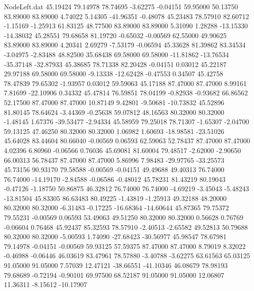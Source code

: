 \begin{filecontents}{NodeLeft.dat}
  45.19424   79.14978   78.74695    -3.62275   -0.04151   59.95000   50.13750   83.89000   83.89000    4.74022    5.14305  -41.96351   -0.48078
  45.23483   78.57910   82.60712    -1.15169   -1.25913   61.83125   48.77500   83.89000   83.89000    5.31090    1.28288  -13.15330  -14.38032
  45.28551   79.68658   81.19720    -0.65032   -0.00569   62.55000   49.90625   83.89000   83.89000    4.20341    2.69279   -7.53179   -0.06594
  45.33628   81.39862   83.34534    -3.04975   -2.83488   48.82500   35.68438   69.58000   69.58000  -11.81862  -13.76534  -35.37148  -32.87933
  45.38685   78.71338   82.20428    -0.04151    0.03012   45.22187   29.97188   69.58000   69.58000   -9.13338  -12.62428   -0.47553    0.34507
  45.42758   78.47839   79.65302    -1.93957    0.03012   59.59063   45.17188   87.47000   87.47000    8.99161    7.81699  -22.10906    0.34332
  45.47814   76.59851   78.04199    -0.82938   -0.93682   66.86562   52.17500   87.47000   87.47000   10.87149    9.42801   -9.50681  -10.73832
  45.52896   81.80145   78.64624    -3.44369   -0.25638   59.07812   48.16563   80.32000   80.32000   -1.48145    1.67376  -39.53477   -2.94334
  45.58959   79.25018   78.71307    -1.65307   -2.04700   59.13125   47.46250   80.32000   80.32000    1.06982    1.60693  -18.98581  -23.51026
  45.64028   83.44604   80.66040    -0.00569    0.06593   62.59063   52.78437   87.47000   87.47000    4.02396    6.80960   -0.06566    0.76036
  45.69081   81.60004   79.48517    -2.62000   -2.90650   66.00313   56.78437   87.47000   87.47000    5.86996    7.98483  -29.97765  -33.25573
  45.73156   90.93170   79.58588    -0.00569   -0.04151   49.49688   49.40313   76.74000   76.74000  -14.19170   -2.84588   -0.06586   -0.48012
  45.78231   81.43219   80.19043    -0.47126   -1.18750   50.86875   46.32812   76.74000   76.74000   -4.69219   -3.45043   -5.48243  -13.81504
  45.83305   86.63483   80.49225    -1.43819   -1.25913   49.32188   48.20000   80.32000   80.32000   -6.31483   -0.17225  -16.68364  -14.60644
  45.87365   79.75372   79.55231    -0.00569    0.06593   53.49063   49.51250   80.32000   80.32000    0.56628    0.76769   -0.06604    0.76468
  45.92437   85.32593   78.57910    -2.40513   -2.65582   49.52813   50.79688   80.32000   80.32000   -5.00593    1.74090  -27.68423  -30.56977
  45.98547   78.67981   79.14978    -0.04151   -0.00569   59.93125   57.59375   87.47000   87.47000    8.79019    8.32022   -0.46988   -0.06446
  46.03619   83.47961   78.57880    -3.40788   -3.62275   63.61563   65.03125   91.05000   91.05000    7.57039   12.47121  -38.66551  -41.10346
  46.08679   78.98193   79.68689    -0.72194   -0.90101   69.97500   68.52187   91.05000   91.05000   12.06807   11.36311   -8.15612  -10.17907

\end{filecontents}

